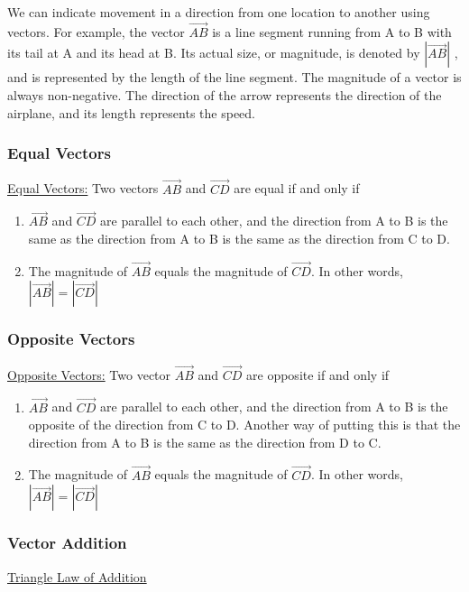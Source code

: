 \documentclass{article}
\begin{document}
We can indicate movement in a direction from one location to another using vectors. For example, the vector $\overrightarrow{AB}$ is a line segment running from A to B with its tail at A and its head at B. Its actual size, or magnitude, is denoted by $|\overrightarrow{AB}|$ , and is represented by the length of the line segment. The magnitude of a vector is always non-negative. The direction of the arrow represents the direction of the airplane, and its length represents the speed.
\newpage
\subsubsection{Equal Vectors}
\underline{Equal Vectors:}
Two vectors $\overrightarrow{AB}$ and $\overrightarrow{CD}$ are equal if and only if\\

\begin{enumerate}
    \item $\overrightarrow{AB}$ and $\overrightarrow{CD}$ are parallel to each other, and the direction from A to B is the same as the direction from A to B is the same as the direction from C to D.
    \item The magnitude of $\overrightarrow{AB}$ equals the magnitude of $\overrightarrow{CD}$. In other words, $|\overrightarrow{AB}|=|\overrightarrow{CD}|$
\end{enumerate}
\subsubsection{Opposite Vectors}
\underline{Opposite Vectors:}
Two vector $\overrightarrow{AB}$ and $\overrightarrow{CD}$ are opposite if and only if
\begin{enumerate}
    \item $\overrightarrow{AB}$ and $\overrightarrow{CD}$ are parallel to each other, and the direction from A to B is the opposite of the direction from C to D. Another way of putting this is that the direction from A to B is the same as the direction from D to C.
    \item The magnitude of $\overrightarrow{AB}$ equals the magnitude of $\overrightarrow{CD}$. In other words, $|\overrightarrow{AB}|=|\overrightarrow{CD}|$
\end{enumerate}
\subsubsection{Vector Addition}
\underline{Triangle Law of Addition}\\
\end{document}
